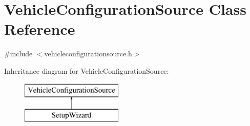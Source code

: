 \hypertarget{class_vehicle_configuration_source}{\section{\-Vehicle\-Configuration\-Source \-Class \-Reference}
\label{class_vehicle_configuration_source}
}


{\ttfamily \#include $<$vehicleconfigurationsource.\-h$>$}

\-Inheritance diagram for \-Vehicle\-Configuration\-Source\-:\begin{figure}[H]
\begin{center}
\leavevmode
\includegraphics[height=2.000000cm]{class_vehicle_configuration_source}
\end{center}
\end{figure}
